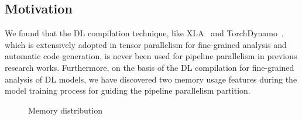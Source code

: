 \subsection{Motivation}
\label{sec:mot}

We found that the DL compilation technique, like XLA~\cite{sabneXlaCompilingMachine2020} and TorchDynamo~\cite{anselPyTorchFasterMachine2024},
which is extensively adopted in tensor parallelism
for fine-grained analysis and automatic code generation,
is never been used for pipeline parallelism in previous research works.
Furthermore, on the basis of the DL compilation for fine-grained analysis of DL models,
we have discovered two memory usage features during the model training process
for guiding the pipeline parallelism partition.
\begin{figure}[htb]
  \centering
  \caption{Memory distribution}
  \label{fig:mem-cdf}
\end{figure}

